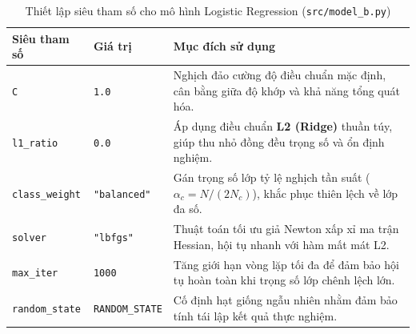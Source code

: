 \begin{table}[H]
\centering
\caption{Thiết lập siêu tham số cho mô hình Logistic Regression (\texttt{src/model\_b.py})}
\label{tab:lr_hyperparams}
\renewcommand{\arraystretch}{1.2}
\begin{tabular}{|l|l|p{8.4cm}|}
\hline
\textbf{Siêu tham số} & \textbf{Giá trị} & \textbf{Mục đích sử dụng} \\
\hline
\texttt{C} & \texttt{1.0} & Nghịch đảo cường độ điều chuẩn mặc định, cân bằng giữa độ khớp và khả năng tổng quát hóa. \\
\hline
\texttt{l1\_ratio} & \texttt{0.0} & Áp dụng điều chuẩn \textbf{L2 (Ridge)} thuần túy, giúp thu nhỏ đồng đều trọng số và ổn định nghiệm. \\
\hline
\texttt{class\_weight} & \texttt{"balanced"} & Gán trọng số lớp tỷ lệ nghịch tần suất ($\alpha_c = N / (2N_c)$), khắc phục thiên lệch về lớp đa số. \\
\hline
\texttt{solver} & \texttt{"lbfgs"} & Thuật toán tối ưu giả Newton xấp xỉ ma trận Hessian, hội tụ nhanh với hàm mất mát L2. \\
\hline
\texttt{max\_iter} & \texttt{1000} & Tăng giới hạn vòng lặp tối đa để đảm bảo hội tụ hoàn toàn khi trọng số lớp chênh lệch lớn. \\
\hline
\texttt{random\_state} & \texttt{RANDOM\_STATE} & Cố định hạt giống ngẫu nhiên nhằm đảm bảo tính tái lập kết quả thực nghiệm. \\
\hline
\end{tabular}
\end{table}
